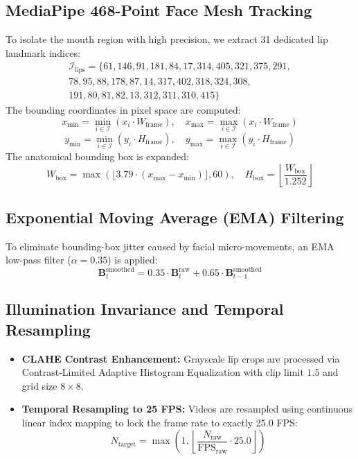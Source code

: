 \documentclass[conference,compsoc,10pt]{IEEEtran}
\begin{document}
\subsection{MediaPipe 468-Point Face Mesh Tracking}
To isolate the mouth region with high precision, we extract 31 dedicated lip landmark indices:
\begin{align}
\mathcal{I}_{\text{lips}} = \{61, 146, 91, 181, 84, 17, 314, 405, 321, 375, 291, \nonumber \\
78, 95, 88, 178, 87, 14, 317, 402, 318, 324, 308, \nonumber \\
191, 80, 81, 82, 13, 312, 311, 310, 415\}
\end{align}
The bounding coordinates in pixel space are computed:
\begin{equation}
x_{\min} = \min_{i \in \mathcal{I}} (x_i \cdot W_{\text{frame}}), \quad x_{\max} = \max_{i \in \mathcal{I}} (x_i \cdot W_{\text{frame}})
\end{equation}
\begin{equation}
y_{\min} = \min_{i \in \mathcal{I}} (y_i \cdot H_{\text{frame}}), \quad y_{\max} = \max_{i \in \mathcal{I}} (y_i \cdot H_{\text{frame}})
\end{equation}
The anatomical bounding box is expanded:
\begin{equation}
W_{\text{box}} = \max\left( \lfloor 3.79 \cdot (x_{\max} - x_{\min}) \rfloor, 60 \right), \quad H_{\text{box}} = \left\lfloor \frac{W_{\text{box}}}{1.252} \right\rfloor
\end{equation}

\subsection{Exponential Moving Average (EMA) Filtering}
To eliminate bounding-box jitter caused by facial micro-movements, an EMA low-pass filter ($\alpha=0.35$) is applied:
\begin{equation}
\mathbf{B}_t^{\text{smoothed}} = 0.35 \cdot \mathbf{B}_t^{\text{raw}} + 0.65 \cdot \mathbf{B}_{t-1}^{\text{smoothed}}
\end{equation}

\subsection{Illumination Invariance and Temporal Resampling}
\begin{itemize}
    \item \textbf{CLAHE Contrast Enhancement:} Grayscale lip crops are processed via Contrast-Limited Adaptive Histogram Equalization with clip limit $1.5$ and grid size $8 \times 8$.
    \item \textbf{Temporal Resampling to 25 FPS:} Videos are resampled using continuous linear index mapping to lock the frame rate to exactly 25.0 FPS:
    \begin{equation}
    N_{\text{target}} = \max\left(1, \left\lfloor \frac{N_{\text{raw}}}{\text{FPS}_{\text{raw}}} \cdot 25.0 \right\rfloor\right)
    \end{equation}
\end{itemize}
\end{document}
